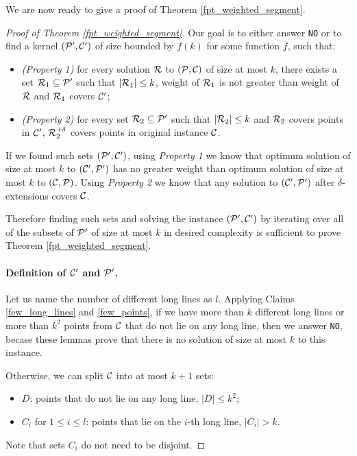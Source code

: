 We are now ready to give a proof of Theorem \ref{fpt_weighted_segment}.

\begin{proof}[Proof of Theorem \ref{fpt_weighted_segment}]
Our goal is to either answer \texttt{NO} or to find a kernel
$(\mathcal{P}', \mathcal{C}')$ of size bounded by $f(k)$ for some function $f$, such that:
\begin{itemize}
\item \textit{(Property 1)} for every solution
$\mathcal{R}$ to $(\mathcal{P}, \mathcal{C})$ of size at most $k$,
there exists a set $\mathcal{R}_1 \subseteq \mathcal{P}'$ such that
$|\mathcal{R}_1| \le k$, weight of $\mathcal{R}_1$ is not greater than weight of $\mathcal{R}$
and $\mathcal{R}_1$ covers $\mathcal{C}'$;
\item \textit{(Property 2)}
for every set $\mathcal{R}_2 \subseteq \mathcal{P}'$ such that $|\mathcal{R}_2| \le k$
and $\mathcal{R}_2$ covers points in $\mathcal{C}'$, $\mathcal{R}_2^{+\delta}$
covers points in original instance $\mathcal{C}$.
\end{itemize}

If we found such sets $(\mathcal{P}', \mathcal{C}')$,
using \textit{Property 1} we know that optimum solution 
of size at most $k$ to $(\mathcal{C}', \mathcal{P}')$
has no greater weight than optimum solution
of size at most $k$ to $(\mathcal{C}, \mathcal{P})$.
Using \textit{Property 2} we know that
any solution to $(\mathcal{C}', \mathcal{P}')$
after $\delta$-extensions covers $\mathcal{C}$.

Therefore finding such sets 
and solving the instance $(\mathcal{P}', \mathcal{C}')$
by iterating over all of the subsets of $\mathcal{P}'$
of size at most $k$
in desired complexity
is sufficient to prove Theorem \ref{fpt_weighted_segment}.

\paragraph{Definition of $\mathcal{C}'$ and $\mathcal{P}'$.}
Let us name the number of different long lines as $l$.
Applying Claims \ref{few_long_lines} and \ref{few_points},
if we have more than $k$ different long lines
or more than $k^2$ points from $\mathcal{C}$
that do not lie on any long line, then we answer \texttt{NO},
becase these lemmas prove that there is no solution of size at most $k$
to this instance.

Otherwise, we can split $\mathcal{C}$ into at most $k+1$ sets:
\begin{itemize}
\item $D$: points that do not lie on any long line, $|D| \le k^2$;
\item $C_i$ for $1 \le i \le l$: points that lie on the $i$-th long line, $|C_i| > k$.
\end{itemize}
Note that sets $C_i$ do not need to be disjoint.


\end{proof}
